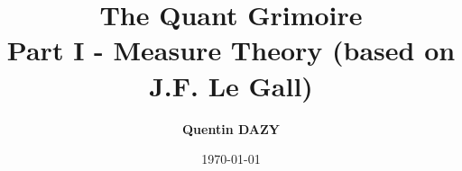 \documentclass[11pt, a4paper]{report}
\begin{document}
\title{\textbf{\Huge The Quant Grimoire} \\[0.8em] \Large Part I - Measure Theory (based on J.F. Le Gall)} 
\author{\textbf{Quentin DAZY}}
\date{\today}
\maketitle

\tableofcontents



\printbibliography[heading=bibintoc, title={Bibliography}]
\end{document}

